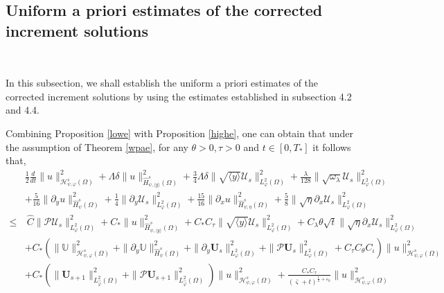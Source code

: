 \documentclass{amsart}
\numberwithin{equation}{section}
\newcommand\y{{{\langle y \rangle}}}
\begin{document}
\subsection{Uniform a priori estimates of the corrected increment solutions}~

In this subsection, we shall establish the uniform a priori estimates of the corrected increment solutions by using the estimates established in subsection 4.2 and 4.4.

Combining Proposition \ref{lowe} with Proposition \ref{highe}, one can obtain that under the assumption of Theorem \ref{wpae}, for any $\theta>0, \tau>0$ and $t\in[0,T_{*}]$ it follows that,
\begin{align}\label{upe-1}
& \frac{1}{2}\frac{d}{dt}\|u\|_{\mathcal{H}_{\psi,\varphi}^{s}(\Omega)}^{2}
 +\Lambda\delta\|u\|_{\hat{H}_{\psi,\y}^{s}(\Omega)}^{2}
 +\frac{3}{4}\Lambda\delta\|\sqrt{\y}\mathcal{U}_{s}\|_{L_{\varphi}^{2}(\Omega)}^{2}
 +\frac{\lambda}{128}\|\sqrt{\omega_{\lambda}}\mathcal{U}_{s}\|_{L_{\varphi}^{2}(\Omega)}^{2}\\
&+\frac{5}{16}\|\partial_{y}u\|_{\hat{H}_{\psi}^{s}(\Omega)}^{2}
 +\frac{1}{4}\|\partial_{y}\mathcal{U}_{s}\|_{L_{\varphi}^{2}(\Omega)}^{2}
 +\frac{15}{16}\|\partial_{x}u\|_{\hat{H}_{\psi,\eta}^{s}(\Omega)}^{2}
 +\frac{5}{8}\|\sqrt{\eta}\partial_{x}\mathcal{U}_{s}\|_{L_{\varphi}^{2}(\Omega)}^{2}\nonumber\\
\leq&~\hat{C}\|\mathcal{P}\mathcal{U}_{s}\|_{L_{\varphi}^{2}(\Omega)}^{2}
     +C_{*}\|u\|_{\hat{H}_{\psi,\y}^{s}(\Omega)}^{2}
     +C_{*}C_{\tau}\|\sqrt{\y}\mathcal{U}_{s}\|_{L_{\varphi}^{2}(\Omega)}^{2}
     +C_{\lambda}\theta\sqrt{t}\|\sqrt{\eta}\partial_{x}\mathcal{U}_{s}\|_{L_{\varphi}^{2}(\Omega)}^{2}\nonumber\\
    &+C_{*}\left(\|\mathbb{U}\|_{\mathcal{H}_{\psi,\varphi}^{s}(\Omega)}^{2}
                +\|\partial_{y}\mathbb{U}\|_{\hat{H}_{\psi}^{s}(\Omega)}^{2}
                +\|\partial_{y}\mathbf{U}_{s}\|_{L_{\varphi}^{2}(\Omega)}^{2}
                +\|\mathcal{P}\mathbf{U}_{s}\|_{L_{\varphi}^{2}(\Omega)}^{2}
                +C_{\tau}C_{\theta}C_{\iota}\right)
          \|u\|_{\mathcal{H}_{\psi,\varphi}^{s}(\Omega)}^{2}\nonumber\\
    &+C_{*}\left(\|\mathbf{U}_{s+1}\|_{L_{\hat{\varphi}}^{2}(\Omega)}^{2}+\|\mathcal{P}\mathbf{U}_{s+1}\|_{L_{\hat{\varphi}}^{2}(\Omega)}^{2}\right)
       \|u\|_{\mathcal{H}_{\psi,\varphi}^{s}(\Omega)}^{2}
     +\frac{C_{*}C_{\tau}}{(\bar{\varsigma}+t)^{\frac{1}{2}+\varepsilon_{0}}}\|u\|_{\mathcal{H}_{\psi,\varphi}^{s}(\Omega)}^{2}

\end{align}
\end{document}
